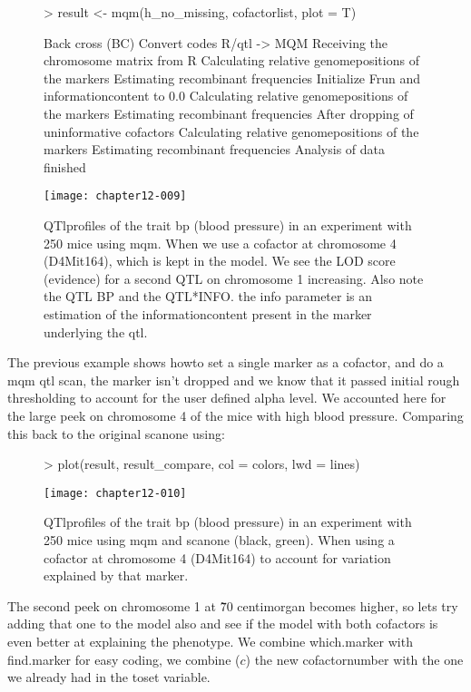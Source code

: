 \documentclass[11pt]{article}
\begin{document}
\begin{figure}[h]
\begin{Schunk}
\begin{Sinput}
> result <- mqm(h_no_missing, cofactorlist, plot = T)
\end{Sinput}
\begin{Soutput}
Back cross (BC)
Convert codes R/qtl -> MQM
Receiving the chromosome matrix from R
Calculating relative genomepositions of the markers
Estimating recombinant frequencies
Initialize Frun and informationcontent to 0.0
Calculating relative genomepositions of the markers
Estimating recombinant frequencies
After dropping of uninformative cofactors
Calculating relative genomepositions of the markers
Estimating recombinant frequencies
Analysis of data finished
\end{Soutput}
\end{Schunk}
\texttt{[image: chapter12-009]}
\\
\caption{QTlprofiles of the trait bp (blood pressure) in an experiment with 250 mice using mqm. When we use a cofactor at chromosome 4 (D4Mit164), which is kept in the model. We see the LOD score (evidence) for a second QTL on chromosome 1 increasing. Also note the QTL BP and the QTL*INFO. the info parameter is an estimation of the informationcontent present in the marker underlying the qtl.}
\end{figure}
The previous example shows howto set a single marker as a cofactor, and do a mqm qtl scan, the marker isn't dropped and we know that it passed initial rough thresholding to account for the user defined alpha level. We accounted here for the large peek on chromosome 4 of the mice with high blood pressure. Comparing this back to the original scanone using:
\begin{figure}[h]
\begin{Schunk}
\begin{Sinput}
> plot(result, result_compare, col = colors, lwd = lines)
\end{Sinput}
\end{Schunk}
\texttt{[image: chapter12-010]}
\caption{QTlprofiles of the trait bp (blood pressure) in an experiment with 250 mice using mqm and scanone (black, green). When using a cofactor at chromosome 4 (D4Mit164) to account for variation explained by that marker.}
\end{figure}
The second peek on chromosome 1 at \~70 centimorgan becomes higher, so lets try adding that one to the model also and see if the model with both cofactors is even better at explaining the phenotype. We combine which.marker with find.marker for easy coding, we combine ($c$) the new cofactornumber with the one we already had in the toset variable.
\end{document}

